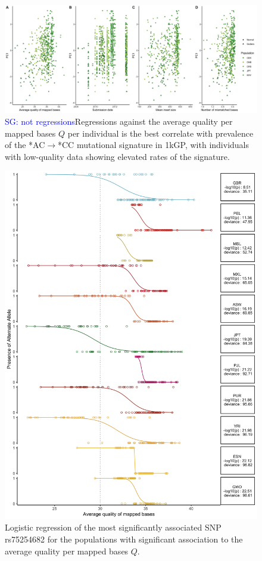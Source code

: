 \documentclass[9pt,lineno]{elife}
\newcommand{\sgcomment}[1]{\textcolor{blue}{SG: #1}}
\begin{document}
\begin{figure}[h]
\includegraphics[width=\hsize,keepaspectratio]{./Figures/PC1_Correlation.jpg}
\caption{\sgcomment{not regressions}Regressions against the average quality per mapped bases $Q$ per individual is the best correlate with prevalence of the  *AC${\rightarrow}$*CC mutational signature in 1kGP, with individuals with low-quality data showing elevated rates of the signature.  }
\label{PC1_Correlation}
\end{figure}

\begin{figure}[h]
\includegraphics[width=\hsize,keepaspectratio]{./Figures/RegressionPlot_mostSig2.jpg}
\caption{Logistic regression of the most significantly associated SNP rs75254682 for the populations with significant association to the average quality per mapped bases $Q$.}
\label{MostSig}
\end{figure}
\end{document}
